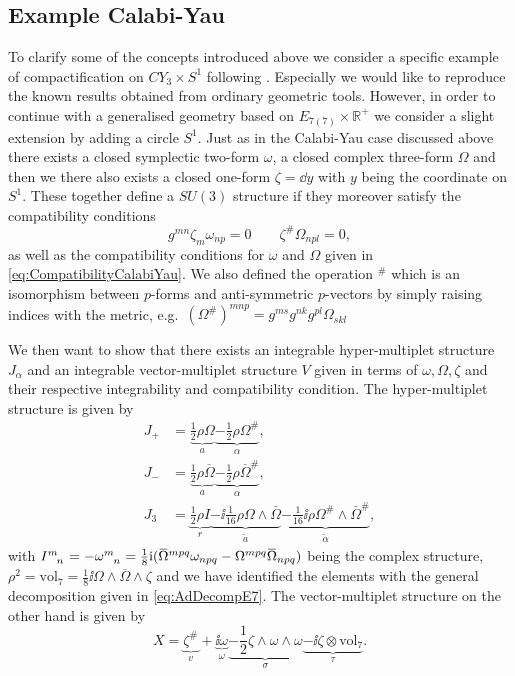 \subsection{Example Calabi-Yau}
To clarify some of the concepts introduced above we consider a specific example of compactification on $CY_3\times S^1$ following \cite{Ashmore:2015joa}. Especially we would like to reproduce the known results obtained from ordinary geometric tools. However, in order to continue with a generalised geometry based on $E_{7(7)}\times \mathbb{R}^+$ we consider a slight extension by adding a circle $S^1$. Just as in the Calabi-Yau case discussed above there exists a closed symplectic two-form $\omega$, a closed complex three-form $\Omega$ and then we there also exists a closed one-form $\zeta=\dd y$ with $y$ being the coordinate on $S^1$. These together define a $SU(3)$ structure if they moreover satisfy the compatibility conditions 
\begin{equation}
    g^{mn}\zeta_m\omega_{np} = 0\qquad \zeta^{\#}\Omega_{npl} = 0,
\end{equation}
as well as the compatibility conditions for $\omega$ and $\Omega$ given in \eqref{eq:CompatibilityCalabiYau}. We also defined the operation $^{\#}$ which is an isomorphism between $p$-forms and anti-symmetric $p$-vectors by simply raising indices with the metric, e.g.\ $(\Omega^{\#})^{mnp}=g^{ms}g^{nk}g^{pl}\Omega_{skl}$

We then want to show that there exists an integrable hyper-multiplet structure $J_\alpha$ and an integrable vector-multiplet structure $V$ given in terms of ${\omega,\Omega,\zeta}$ and their respective integrability and compatibility condition. The hyper-multiplet structure is given by
\begin{equation}
    \begin{aligned}
        J_+ &= \underbrace{\frac{1}{2}\rho\Omega}_{a} \underbrace{-\frac{1}{2}\rho\Omega^{\#}}_{\alpha},\\
        J_- &= \underbrace{\frac{1}{2}\rho\overbar{\Omega}}_{a} \underbrace{-\frac{1}{2}\rho\overbar{\Omega}^{\#}}_{\alpha},\\
        J_3 &= \underbrace{\frac{1}{2}\rho I}_{r}\underbrace{-\ii\frac{1}{16}\rho\Omega\wedge\overbar{\Omega}}_{\tilde{a}}\underbrace{-\frac{1}{16}\ii\rho\Omega^{\#}\wedge\overbar{\Omega}^{\#}}_{\tilde{\alpha}},
    \end{aligned}
\end{equation}
with $\tensor{I}{^m_n}=-\tensor{\omega}{^m_n}=\frac{1}{8}\ii (\overbar{\Omega}^{mpq}\omega_{npq}-\Omega^{mpq}\overbar{\Omega}_{npq})$ being the complex structure, $\rho^2=\text{vol}_7=\frac{1}{8}\ii\Omega\wedge\overbar{\Omega}\wedge\zeta$ and we have identified the elements with the general decomposition given in \eqref{eq:AdDecompE7}. The vector-multiplet structure on the other hand is given by 
\begin{equation}
    X = \underbrace{\zeta^{\#}}_{v}+\underbrace{\ii\omega}_{\omega}\underbrace{-\frac{1}{2}\zeta\wedge\omega\wedge\omega}_{\sigma}\underbrace{-\ii\zeta\otimes\text{vol}_7}_{\tau}.
\end{equation}

